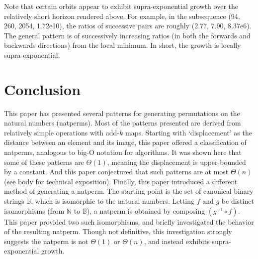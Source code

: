 \documentclass[12pt,reqno]{article}
\begin{document}
Note that certain orbits appear to exhibit supra-exponential growth over the relatively short horizon rendered above. For example, in the subsequence (94, 260, 2054, 1.72e10), the ratios of successive pairs are roughly (2.77, 7.90, 8.37e6). The general pattern is of successively increasing ratios (in both the forwards and backwards directions) from the local minimum. In short, the growth is locally supra-exponential.

\section{Conclusion}

This paper has presented several patterns for generating permutations on the natural numbers (natperms). Most of the patterns presented are derived from relatively simple operations with add-$k$ maps. Starting with `displacement' as the distance between an element and its image, this paper offered a classification of natperms, analogous to big-O notation for algorithms. It was shown here that some of these patterns are $\Theta(1)$, meaning the displacement is upper-bounded by a constant. And this paper conjectured that such patterns are at most $\Theta(n)$ (see body for technical exposition). Finally, this paper introduced a different method of generating a natperm. The starting point is the set of canonical binary strings $\mathbb{B}$, which is isomorphic to the natural numbers. Letting $f$ and $g$ be distinct isomorphisms (from $\mathbb{N}$ to $\mathbb{B}$), a natperm is obtained by composing $(g^{-1} \circ f)$. This paper provided two such isomorphisms, and briefly investigated the behavior of the resulting natperm. Though not definitive, this investigation strongly suggests the natperm is not $\Theta(1)$ or $\Theta(n)$, and instead exhibits supra-exponential growth.
\end{document}
